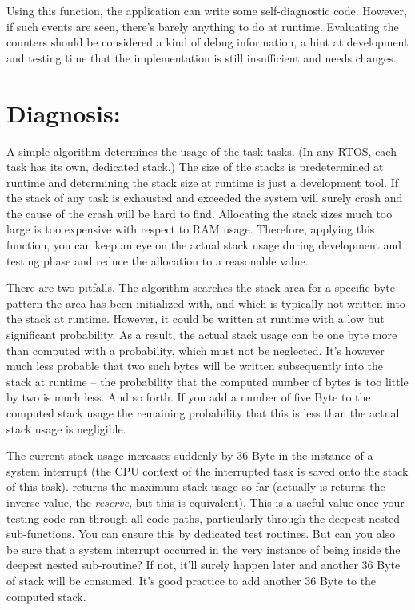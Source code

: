 Using this function, the application can write some self-diagnostic code.
However, if such events are seen, there's barely anything to do at
runtime. Evaluating the counters should be considered a kind of debug
information, a hint at development and testing time that the
implementation is still insufficient and needs changes.


\section{Diagnosis: }

A simple algorithm determines the usage of the task tasks. (In any RTOS,
each task has its own, dedicated stack.) The size of the stacks is
predetermined at runtime and determining the stack size at runtime is just
a development tool. If the stack of any task is exhausted and exceeded the
system will surely crash and the cause of the crash will be hard to find.
Allocating the stack sizes much too large is too expensive with respect to
RAM usage. Therefore, applying this function, you can keep an eye on the
actual stack usage during development and testing phase and reduce the
allocation to a reasonable value.

There are two pitfalls. The algorithm searches the stack area for a
specific byte pattern the area has been initialized with, and which is
typically not written into the stack at runtime. However, it could be
written at runtime with a low but significant probability. As a result,
the actual stack usage can be one byte more than computed with a
probability, which must not be neglected. It's however much less probable
that two such bytes will be written subsequently into the stack at runtime
-- the probability that the computed number of bytes is too little by two
is much less. And so forth. If you add a number of five Byte to the
computed stack usage the remaining probability that this is less than the
actual stack usage is negligible.

The current stack usage increases suddenly by 36 Byte in the
instance of a system interrupt (the CPU context of the interrupted task is
saved onto the stack of this task).  returns
the maximum stack usage so far (actually is returns the inverse value, the
\emph{reserve}, but this is equivalent). This is a useful value once your
testing code ran through all code paths, particularly through the deepest
nested sub-functions. You can ensure this by dedicated test routines. But
can you also be sure that a system interrupt occurred in the very instance of
being inside the deepest nested sub-routine? If not, it'll surely happen
later and another 36 Byte of stack will be consumed. It's good practice to
add another 36 Byte to the computed stack.

